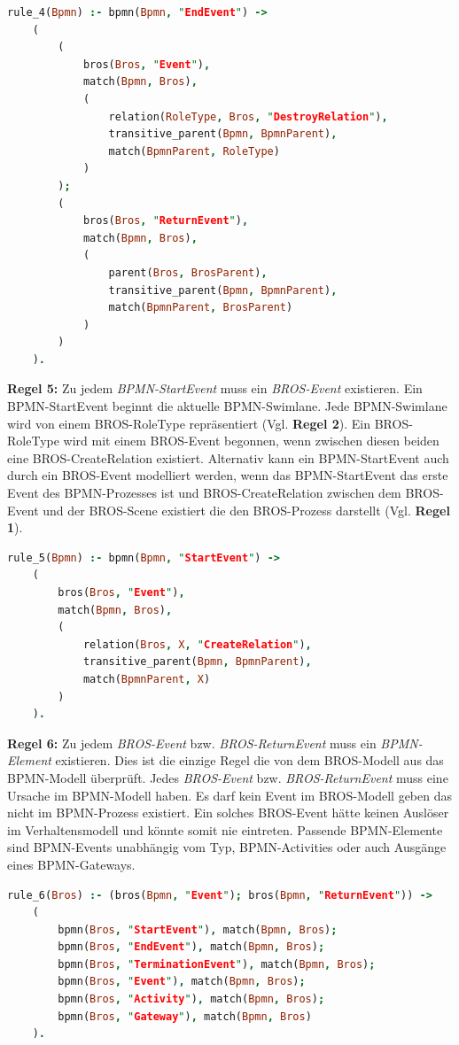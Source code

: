 \begin{lstlisting}[language=Prolog, caption=Regel 4]
rule_4(Bpmn) :- bpmn(Bpmn, "EndEvent") ->
    (
        (
            bros(Bros, "Event"),
            match(Bpmn, Bros),
            (
                relation(RoleType, Bros, "DestroyRelation"),
                transitive_parent(Bpmn, BpmnParent),
                match(BpmnParent, RoleType)
            )
        );
        (
            bros(Bros, "ReturnEvent"), 
            match(Bpmn, Bros),
            (
                parent(Bros, BrosParent),
                transitive_parent(Bpmn, BpmnParent),
                match(BpmnParent, BrosParent)
            )
        )
    ).
\end{lstlisting}

\textbf{Regel 5:} Zu jedem \emph{BPMN-StartEvent} muss ein \emph{BROS-Event} existieren.
Ein BPMN-StartEvent beginnt die aktuelle BPMN-Swimlane.
Jede BPMN-Swimlane wird von einem BROS-RoleType repräsentiert (Vgl. \textbf{Regel 2}).
Ein BROS-RoleType wird mit einem BROS-Event begonnen, wenn  zwischen diesen beiden eine BROS-CreateRelation existiert.
Alternativ kann ein BPMN-StartEvent auch durch ein BROS-Event modelliert werden, wenn das BPMN-StartEvent das erste Event des BPMN-Prozesses ist und BROS-CreateRelation zwischen dem BROS-Event und der BROS-Scene existiert die den BROS-Prozess darstellt (Vgl. \textbf{Regel 1}).

\begin{lstlisting}[language=Prolog, caption=Regel 5]
rule_5(Bpmn) :- bpmn(Bpmn, "StartEvent") ->
    (
        bros(Bros, "Event"),
        match(Bpmn, Bros),
        (
            relation(Bros, X, "CreateRelation"),
            transitive_parent(Bpmn, BpmnParent),
            match(BpmnParent, X)
        )
    ).
\end{lstlisting}

\textbf{Regel 6:} Zu jedem \emph{BROS-Event} bzw. \emph{BROS-ReturnEvent} muss ein \emph{BPMN-Element} existieren.
Dies ist die einzige Regel die von dem BROS-Modell aus das BPMN-Modell überprüft.
Jedes \emph{BROS-Event} bzw. \emph{BROS-ReturnEvent} muss eine Ursache im BPMN-Modell haben.
Es darf kein Event im BROS-Modell geben das nicht im BPMN-Prozess existiert.
Ein solches BROS-Event hätte keinen Auslöser im Verhaltensmodell und könnte somit nie eintreten.
Passende BPMN-Elemente sind BPMN-Events unabhängig vom Typ, BPMN-Activities oder auch Ausgänge eines BPMN-Gateways.

\begin{lstlisting}[language=Prolog, caption=Regel 6]
rule_6(Bros) :- (bros(Bpmn, "Event"); bros(Bpmn, "ReturnEvent")) ->
    (
        bpmn(Bros, "StartEvent"), match(Bpmn, Bros);
        bpmn(Bros, "EndEvent"), match(Bpmn, Bros);
        bpmn(Bros, "TerminationEvent"), match(Bpmn, Bros);
        bpmn(Bros, "Event"), match(Bpmn, Bros);
        bpmn(Bros, "Activity"), match(Bpmn, Bros);
        bpmn(Bros, "Gateway"), match(Bpmn, Bros)
    ).
\end{lstlisting}

